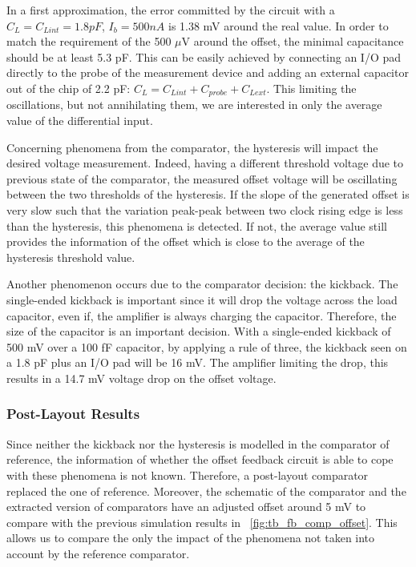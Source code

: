 In a first approximation, the error committed by the circuit with a $C_L = C_{Lint} = 1.8 pF$, $I_b = 500 nA$ is 1.38 mV around the real value. In order to match the requirement of the 500 $\mu$V around the offset, the minimal capacitance should be at least 5.3 pF. This can be easily achieved by connecting an I/O pad directly to the probe of the measurement device and adding an external capacitor out of the chip of 2.2 pF: $C_L = C_{Lint} + C_{probe} + C_{Lext}$. This limiting the oscillations, but not annihilating them, we are interested in only the average value of the differential input.

Concerning phenomena from the comparator, the hysteresis will impact the desired voltage measurement. Indeed, having a different threshold voltage due to previous state of the comparator, the measured offset voltage will be oscillating between the two thresholds of the hysteresis. 
If the slope of the generated offset is very slow such that the variation peak-peak between two clock rising edge is less than the hysteresis, this phenomena is detected. If not, the average value still provides the information of the offset which is close to the average of the hysteresis threshold value.

Another phenomenon occurs due to the comparator decision: the kickback. The single-ended kickback is important since it will drop the voltage across the load capacitor, even if, the amplifier is always charging the capacitor. Therefore, the size of the capacitor is an important decision.
With a single-ended kickback of 500 mV over a 100 fF capacitor, by applying a rule of three, the kickback seen on a 1.8 pF plus an I/O pad will be 16 mV. The amplifier limiting the drop, this results in a 14.7 mV voltage drop on the offset voltage.


\subsubsection{Post-Layout Results}
Since neither the kickback nor the hysteresis is modelled in the comparator of reference, the information of whether the offset feedback circuit is able to cope with these phenomena is not known. Therefore, a post-layout comparator replaced the one of reference. Moreover, the schematic of the comparator and the extracted version of comparators have an adjusted offset around 5 mV to compare with the previous simulation results in \figurename~\ref{fig:tb_fb_comp_offset}. This allows us to compare the only the impact of the phenomena not taken into account by the reference comparator.

